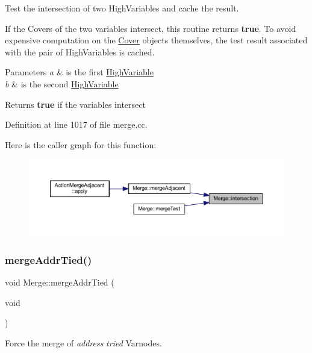 Test the intersection of two High\+Variables and cache the result. 

If the Covers of the two variables intersect, this routine returns {\bfseries{true}}. To avoid expensive computation on the \mbox{\hyperlink{class_cover}{Cover}} objects themselves, the test result associated with the pair of High\+Variables is cached. 
\begin{DoxyParams}{Parameters}
{\em a} & is the first \mbox{\hyperlink{class_high_variable}{High\+Variable}} \\
\hline
{\em b} & is the second \mbox{\hyperlink{class_high_variable}{High\+Variable}} \\
\hline
\end{DoxyParams}
\begin{DoxyReturn}{Returns}
{\bfseries{true}} if the variables intersect 
\end{DoxyReturn}


Definition at line 1017 of file merge.\+cc.

Here is the caller graph for this function\+:
\nopagebreak
\begin{figure}[H]
\begin{center}
\leavevmode
\includegraphics[width=350pt]{class_merge_abc0c74b3892b9724fd4091a126631089_icgraph}
\end{center}
\end{figure}
\mbox{\label{class_merge_a8045c24ce73080b02d4506f2047a414e}} 
\subsubsection{\texorpdfstring{mergeAddrTied()}{mergeAddrTied()}}
{\footnotesize\ttfamily void Merge\+::merge\+Addr\+Tied (\begin{DoxyParamCaption}\item[{void}]{ }\end{DoxyParamCaption})}



Force the merge of {\itshape address} {\itshape tried} Varnodes. 

